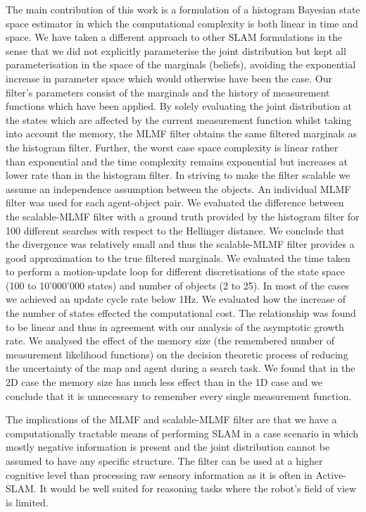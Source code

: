 The main contribution of this work is a formulation of a histogram Bayesian state space estimator in which the computational complexity is 
both linear in time and space. We have taken a different approach to other SLAM formulations in the sense that we did not
explicitly parameterise the joint distribution but kept all parameterisation in the space of the marginals (beliefs),
avoiding the exponential increase in parameter space which would otherwise have been the case. Our filter's parameters 
consist of the marginals and the history of measurement functions which have been applied. By solely evaluating the joint 
distribution at the states which are affected by the current measurement function whilst taking into account the 
memory, the MLMF filter obtains the same filtered marginals as the histogram filter. Further, the worst case space complexity is 
linear rather than exponential and the time complexity remains exponential but increases at lower rate than in the histogram filter.
In striving to make the filter scalable we assume an independence assumption between the objects. An individual MLMF filter
was used for each agent-object pair. We evaluated the difference between the scalable-MLMF filter with a ground truth provided 
by the histogram filter for 100 different searches with respect to the Hellinger distance. We conclude that 
the divergence was relatively small and thus the scalable-MLMF filter provides a good approximation to the true filtered
marginals. We evaluated the time taken to perform a motion-update loop for different discretisations of the state 
space (100 to 10'000'000 states) and number of objects (2 to 25). In most of the cases we achieved an update cycle rate below 1Hz. We evaluated how the increase of the number of states 
effected the computational cost. The relationship was found to be linear and thus in agreement with our analysis of 
the asymptotic growth rate. We analysed the effect of the memory size (the remembered number of measurement likelihood functions) 
on the decision theoretic process of reducing the uncertainty of the map and agent during a search task. 
We found that in the 2D case the memory size has much less effect than in the 1D case and we conclude that it 
is unnecessary to remember every single measurement function.

The implications of the MLMF and scalable-MLMF filter are that we have a computationally tractable means of 
performing SLAM in a case scenario in which mostly negative information is present and the 
joint distribution cannot be assumed to have any specific structure. The filter can be used at a higher cognitive level than 
processing raw sensory information as it is often in Active-SLAM. It would be well suited for reasoning tasks 
where the robot's field of view is limited.

